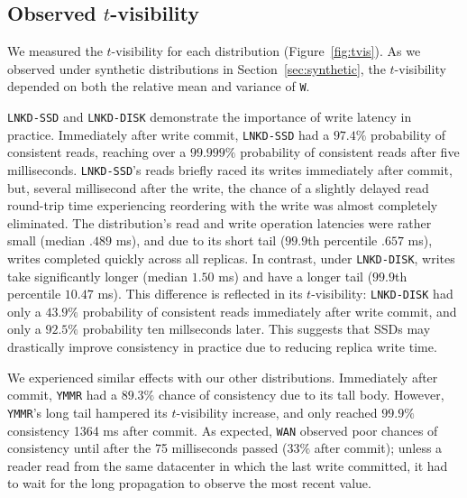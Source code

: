 \documentclass{vldb}
\newcommand{\subsectionskip}{-0em}
\begin{document}
\vspace{\subsectionskip}\subsection{Observed {\large$t$}-visibility}

We measured the $t$-visibility for each distribution
(Figure~\ref{fig:tvis}). As we observed under synthetic distributions
in Section~\ref{sec:synthetic}, the $t$-visibility depended on both
the relative mean and variance of \texttt{W}.

\texttt{LNKD-SSD} and \texttt{LNKD-DISK} demonstrate the importance of
write latency in practice.  Immediately after write commit,
\texttt{LNKD-SSD} had a $97.4\%$ probability of consistent reads,
reaching over a $99.999\%$ probability of consistent reads after five
milliseconds. \texttt{LNKD-SSD}'s reads briefly raced its writes
immediately after commit, but, several millisecond after the write,
the chance of a slightly delayed read round-trip time experiencing
reordering with the write was almost completely eliminated. The
distribution's read and write operation latencies were rather small
(median $.489$ ms), and due to its short tail ($99.9$th percentile
$.657$ ms), writes completed quickly across all replicas.  In
contrast, under \texttt{LNKD-DISK}, writes take significantly longer
(median $1.50$ ms) and have a longer tail ($99.9$th percentile $10.47$
ms).  This difference is reflected in its $t$-visibility:
\texttt{LNKD-DISK} had only a $43.9\%$ probability of consistent reads
immediately after write commit, and only a $92.5\%$ probability ten
millseconds later.  This suggests that SSDs may drastically improve
consistency in practice due to reducing replica write time.

We experienced similar effects with our other distributions.
Immediately after commit, \texttt{YMMR} had a $89.3\%$ chance of
consistency due to its tall body.  However, \texttt{YMMR}'s long tail
hampered its $t$-visibility increase, and only reached $99.9\%$
consistency 1364 ms after commit.  As expected, \texttt{WAN} observed
poor chances of consistency until after the 75 milliseconds passed
($33\%$ after commit); unless a reader read from the same datacenter
in which the last write committed, it had to wait for the long
propagation to observe the most recent value.
\end{document}
